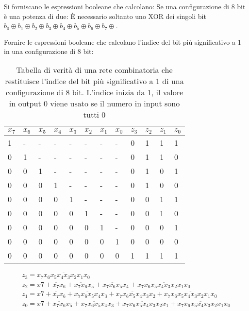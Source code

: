 \begin{exrc}
	Si forniscano le espressioni booleane che calcolano: Se una configurazione
	di 8 bit è una potenza di due: È necessario soltanto uno XOR dei singoli bit
	$ b_0 \oplus b_1 \oplus b_2 \oplus b_3 \oplus b_4 \oplus b_5 \oplus b_6
	\oplus b_7 \oplus $.
	
	Fornire le espressioni booleane che calcolano l'indice del bit più
	significativo a 1 in una configurazione di 8 bit: 
	\begin{table}[H]
		\centering
		\caption{Tabella di verità di una rete combinatoria che restituisce l'indice del bit più significativo a 1 di una configurazione di 8 bit. L'indice inizia da 1, il valore in output 0 viene usato se il numero in input sono tutti 0}
		\label{tab:homework1}
		\begin{tabular}{|llllllll|llll|}
			\hline
			$x_7$ & $x_6$ & $x_5$ & $x_4$ & $x_3$ & $x_2$ & $x_1$ & $x_0$ &
			$z_3$ & $z_2$ & $z_1$ & $z_0$ \\ \hline
			1     & -     & -     & -     & -     & -     & -     & -     & 0
			& 1     & 1     & 1     \\ \hline
			0     & 1     & -     & -     & -     & -     & -     & -     & 0
			& 1     & 1     & 0     \\ \hline
			0     & 0     & 1     & -     & -     & -     & -     & -     & 0
			& 1     & 0     & 1     \\ \hline
			0     & 0     & 0     & 1     & -     & -     & -     & -     & 0
			& 1     & 0     & 0     \\ \hline
			0     & 0     & 0     & 0     & 1     & -     & -     & -     & 0
			& 0     & 1     & 1     \\ \hline
			0     & 0     & 0     & 0     & 0     & 1     & -     & -     & 0
			& 0     & 1     & 0     \\ \hline
			0     & 0     & 0     & 0     & 0     & 0     & 1     & -     & 0
			& 0     & 0     & 1     \\ \hline
			0     & 0     & 0     & 0     & 0     & 0     & 0     & 1     & 0
			& 0     & 0     & 0     \\ \hline
			0     & 0     & 0     & 0     & 0     & 0     & 0     & 0     & 1
			& 1     & 1     & 1     \\ \hline
		\end{tabular}
	\end{table}

	\begin{equation*}
		\begin{aligned}
		z_3 = \overbar{x_7x_6x_5x_4x_3x_2x_1x_0} \\
		z_2 = x7 + \overbar{x_7}x_6 + \overbar{x_7x_6}x_5 + \overbar{x_7x_6x_5}x_4 + \overbar{x_7x_6x_5x_4x_3x_2x_1x_0} \\
		z_1 = x7 + \overbar{x_7}x_6 + \overbar{x_7x_6x_5x_4}x_3 + \overbar{x_7x_6x_5x_4x_3}x_2 + \overbar{x_7x_6x_5x_4x_3x_2x_1x_0} \\
		z_0 = x7 + \overbar{x_7x_6}x_5 + \overbar{x_7x_6x_5x_4}x_3 + \overbar{x_7x_6x_5x_4x_3x_2}x_1 + \overbar{x_7x_6x_5x_4x_3x_2x_1}x_0 \\
		\end{aligned}
	\end{equation*}
\end{exrc}

